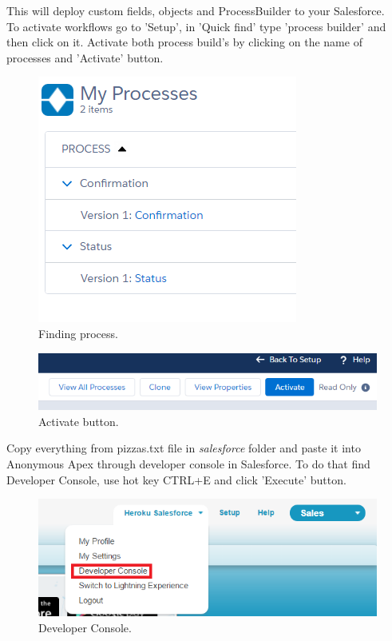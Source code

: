 \documentclass[12pt,a4paper]{article}
\begin{document}
This will deploy custom fields, objects and ProcessBuilder to your  Salesforce.\\
To activate workflows go to 'Setup', in 'Quick find' type 'process builder' and then click on it. Activate both process build's by clicking on the name of processes and 'Activate' button.
\begin{figure}[H]
	\centering
	\includegraphics{images/process.PNG}
	\caption{Finding process.}
	\label{fig:process}
\end{figure}
\begin{figure}[H]
	\centering
	\includegraphics{images/process2.PNG}
	\caption{Activate button.}
	\label{fig:processs}
\end{figure}

Copy everything from pizzas.txt file in \textit{salesforce} folder and paste it into Anonymous Apex through developer console in Salesforce.
To do that find Developer Console, use hot key CTRL+E and click 'Execute' button.

\begin{figure}[H]
	\centering
	\includegraphics[width=1\textwidth]{images/deploy1.PNG}
	\caption{Developer Console.}
	\label{fig:console}
\end{figure}
\end{document}
